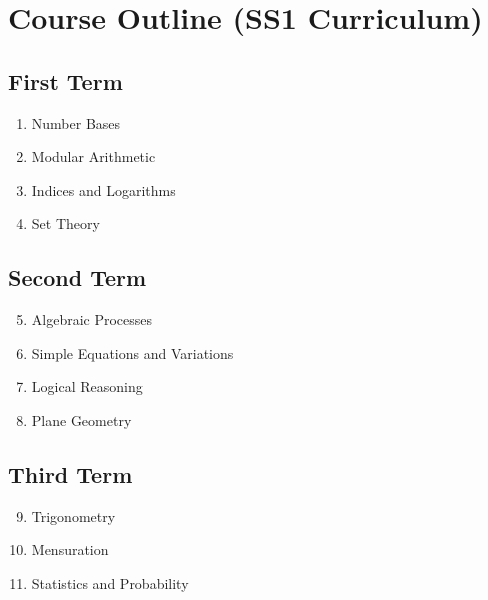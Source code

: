 
\chapter*{Course Outline (SS1 Curriculum)}

\section*{First Term}
\begin{enumerate}
    \item Number Bases
    \item Modular Arithmetic
    \item Indices and Logarithms
    \item Set Theory
\end{enumerate}

\section*{Second Term}
\begin{enumerate}
    \setcounter{enumi}{4}
    \item Algebraic Processes
    \item Simple Equations and Variations
    \item Logical Reasoning
    \item Plane Geometry
\end{enumerate}

\section*{Third Term}
\begin{enumerate}
    \setcounter{enumi}{8}
    \item Trigonometry
    \item Mensuration
    \item Statistics and Probability
\end{enumerate}
